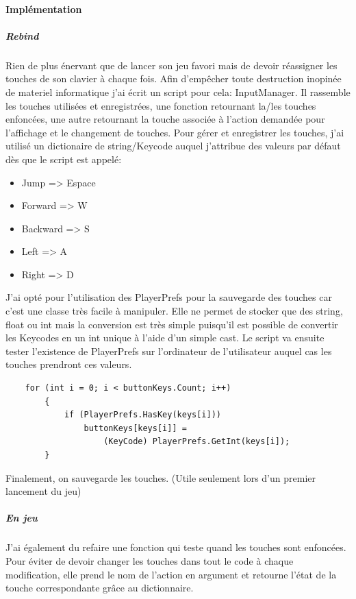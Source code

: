 \documentclass{article}
\begin{document}
\paragraph{Implémentation}

\subparagraph{Rebind}
Rien de plus énervant que de lancer son jeu favori mais de devoir réassigner les touches de son clavier à chaque fois. Afin d'empêcher toute destruction inopinée de materiel informatique j'ai écrit un script pour cela: InputManager. Il rassemble les touches utilisées et enregistrées, une fonction retournant la/les touches enfoncées, une autre retournant la touche associée à l'action demandée pour l'affichage et le changement de touches.
\newline Pour gérer et enregistrer les touches, j'ai utilisé un dictionaire de string/Keycode auquel j'attribue des valeurs par défaut dès que le script est appelé:

\begin{itemize}
    \item Jump => Espace
    \item Forward => W
    \item Backward => S
    \item Left => A
    \item Right => D
\end{itemize}

J'ai opté pour l'utilisation des PlayerPrefs pour la sauvegarde des touches car c'est une classe très facile à manipuler. Elle ne permet de stocker que des string, float ou int mais la conversion est très simple puisqu'il est possible de convertir les Keycodes en un int unique à l'aide d'un simple cast.
\newline Le script va ensuite tester l'existence de PlayerPrefs sur l'ordinateur de l'utilisateur auquel cas les touches prendront ces valeurs.

\par\vspace{0.2cm}
\begin{lstlisting}
    for (int i = 0; i < buttonKeys.Count; i++)
        {
            if (PlayerPrefs.HasKey(keys[i]))
                buttonKeys[keys[i]] = 
                    (KeyCode) PlayerPrefs.GetInt(keys[i]);
        }
\end{lstlisting}

Finalement, on sauvegarde les touches. (Utile seulement lors d'un premier lancement du jeu)

\subparagraph{En jeu}
J'ai également du refaire une fonction qui teste quand les touches sont enfoncées. Pour éviter de devoir changer les touches dans tout le code à chaque modification, elle prend le nom de l'action en argument et retourne l'état de la touche correspondante grâce au dictionnaire.
\end{document}
